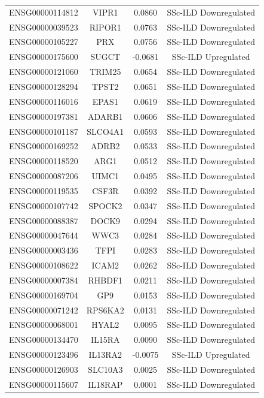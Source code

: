 \documentclass[
]{article}
\begin{document}
\begin{singlespace}
\begin{longtable}[t]{lccc}
ENSG00000114812 & VIPR1 & 0.0860 & SSc-ILD Downregulated\\
ENSG00000039523 & RIPOR1 & 0.0763 & SSc-ILD Downregulated\\
ENSG00000105227 & PRX & 0.0756 & SSc-ILD Downregulated\\
ENSG00000175600 & SUGCT & -0.0681 & SSc-ILD Upregulated\\
\addlinespace
ENSG00000121060 & TRIM25 & 0.0654 & SSc-ILD Downregulated\\
ENSG00000128294 & TPST2 & 0.0651 & SSc-ILD Downregulated\\
ENSG00000116016 & EPAS1 & 0.0619 & SSc-ILD Downregulated\\
ENSG00000197381 & ADARB1 & 0.0606 & SSc-ILD Downregulated\\
ENSG00000101187 & SLCO4A1 & 0.0593 & SSc-ILD Downregulated\\
\addlinespace
ENSG00000169252 & ADRB2 & 0.0533 & SSc-ILD Downregulated\\
ENSG00000118520 & ARG1 & 0.0512 & SSc-ILD Downregulated\\
ENSG00000087206 & UIMC1 & 0.0495 & SSc-ILD Downregulated\\
ENSG00000119535 & CSF3R & 0.0392 & SSc-ILD Downregulated\\
ENSG00000107742 & SPOCK2 & 0.0347 & SSc-ILD Downregulated\\
\addlinespace
ENSG00000088387 & DOCK9 & 0.0294 & SSc-ILD Downregulated\\
ENSG00000047644 & WWC3 & 0.0284 & SSc-ILD Downregulated\\
ENSG00000003436 & TFPI & 0.0283 & SSc-ILD Downregulated\\
ENSG00000108622 & ICAM2 & 0.0262 & SSc-ILD Downregulated\\
ENSG00000007384 & RHBDF1 & 0.0211 & SSc-ILD Downregulated\\
\addlinespace
ENSG00000169704 & GP9 & 0.0153 & SSc-ILD Downregulated\\
ENSG00000071242 & RPS6KA2 & 0.0131 & SSc-ILD Downregulated\\
ENSG00000068001 & HYAL2 & 0.0095 & SSc-ILD Downregulated\\
ENSG00000134470 & IL15RA & 0.0090 & SSc-ILD Downregulated\\
ENSG00000123496 & IL13RA2 & -0.0075 & SSc-ILD Upregulated\\
\addlinespace
ENSG00000126903 & SLC10A3 & 0.0025 & SSc-ILD Downregulated\\
ENSG00000115607 & IL18RAP & 0.0001 & SSc-ILD Downregulated\\*
\end{longtable}
\endgroup{}




\end{singlespace}
\end{document}
